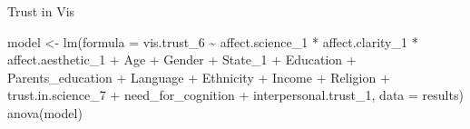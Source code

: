 \documentclass[
]{article}
\newenvironment{Shaded}{\begin{snugshade}}{\end{snugshade}}
\newcommand{\AttributeTok}[1]{\textcolor[rgb]{0.77,0.63,0.00}{#1}}
\newcommand{\FunctionTok}[1]{\textcolor[rgb]{0.00,0.00,0.00}{#1}}
\newcommand{\NormalTok}[1]{#1}
\newcommand{\OtherTok}[1]{\textcolor[rgb]{0.56,0.35,0.01}{#1}}
\newcommand{\SpecialCharTok}[1]{\textcolor[rgb]{0.00,0.00,0.00}{#1}}
\begin{document}
Trust in Vis

\begin{Shaded}
\begin{Highlighting}[]
\NormalTok{model }\OtherTok{\textless{}{-}} \FunctionTok{lm}\NormalTok{(}\AttributeTok{formula =}\NormalTok{ vis.trust\_6 }\SpecialCharTok{\textasciitilde{}}\NormalTok{ affect.science\_1 }\SpecialCharTok{*}\NormalTok{ affect.clarity\_1 }\SpecialCharTok{*}\NormalTok{ affect.aesthetic\_1 }\SpecialCharTok{+}
\NormalTok{              Age }\SpecialCharTok{+}\NormalTok{ Gender }\SpecialCharTok{+}\NormalTok{ State\_1 }\SpecialCharTok{+}\NormalTok{ Education }\SpecialCharTok{+}\NormalTok{ Parents\_education }\SpecialCharTok{+}\NormalTok{ Language }\SpecialCharTok{+} 
\NormalTok{              Ethnicity }\SpecialCharTok{+}\NormalTok{ Income }\SpecialCharTok{+}\NormalTok{ Religion }\SpecialCharTok{+}\NormalTok{ trust.in.science\_7 }\SpecialCharTok{+} 
\NormalTok{              need\_for\_cognition }\SpecialCharTok{+}\NormalTok{ interpersonal.trust\_1,}
            \AttributeTok{data =}\NormalTok{ results)}
\FunctionTok{anova}\NormalTok{(model)}
\end{Highlighting}
\end{Shaded}
\end{document}
